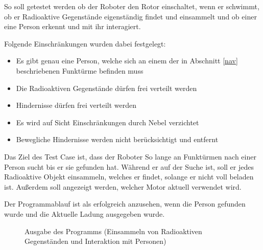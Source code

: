 So soll getestet werden ob der Roboter den Rotor einschaltet, wenn er schwimmt, ob er Radioaktive Gegenstände eigenständig findet und einsammelt und ob einer eine Person erkennt und mit ihr interagiert. 

Folgende Einschränkungen wurden dabei festgelegt: 

\begin{itemize}
	\item Es gibt genau eine Person, welche sich an einem der in Abschnitt \ref{nav} beschriebenen Funktürme befinden muss
	\item Die Radioaktiven Gegenstände dürfen frei verteilt werden
	\item Hindernisse dürfen frei verteilt werden
	\item Es wird auf Sicht Einschränkungen durch Nebel verzichtet
	\item Bewegliche Hindernisse werden nicht berücksichtigt und entfernt
\end{itemize}
 
Das Ziel des Test Case ist, dass der Roboter So lange an Funktürmen nach einer Person sucht bis er sie gefunden hat. Während er auf der Suche ist, soll er jedes Radioaktive Objekt einsammeln, welches er findet, solange er nicht voll beladen ist. Außerdem soll angezeigt werden, welcher Motor aktuell verwendet wird.

Der Programmablauf ist als erfolgreich anzusehen, wenn die Person gefunden wurde und die Aktuelle Ladung ausgegeben wurde.

\begin{figure}[H]
  \caption{Ausgabe des Programms (Einsammeln von Radioaktiven Gegenständen und Interaktion mit Personen)}
  \label{output}
\end{figure}


